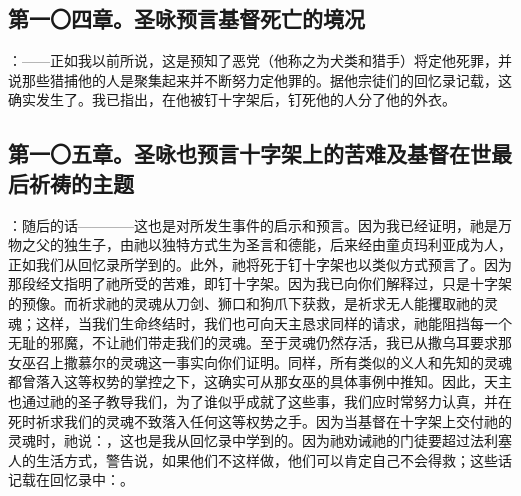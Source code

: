 
\subsection{第一〇四章。圣咏预言基督死亡的境况}

：——正如我以前所说，这是预知了恶党（他称之为犬类和猎手）将定他死罪，并说那些猎捕他的人是聚集起来并不断努力定他罪的。据他宗徒们的回忆录记载，这确实发生了。我已指出，在他被钉十字架后，钉死他的人分了他的外衣。\par


\subsection{第一〇五章。圣咏也预言十字架上的苦难及基督在世最后祈祷的主题}

：随后的话————这也是对所发生事件的启示和预言。因为我已经证明，祂是万物之父的独生子，由祂以独特方式生为圣言和德能，后来经由童贞玛利亚成为人，正如我们从回忆录所学到的。此外，祂将死于钉十字架也以类似方式预言了。因为那段经文指明了祂所受的苦难，即钉十字架。因为我已向你们解释过，只是十字架的预像。而祈求祂的灵魂从刀剑、狮口和狗爪下获救，是祈求无人能攫取祂的灵魂；这样，当我们生命终结时，我们也可向天主恳求同样的请求，祂能阻挡每一个无耻的邪魔，不让祂们带走我们的灵魂。至于灵魂仍然存活，我已从撒乌耳要求那女巫召上撒慕尔的灵魂这一事实向你们证明。同样，所有类似的义人和先知的灵魂都曾落入这等权势的掌控之下，这确实可从那女巫的具体事例中推知。因此，天主也通过祂的圣子教导我们，为了谁似乎成就了这些事，我们应时常努力认真，并在死时祈求我们的灵魂不致落入任何这等权势之手。因为当基督在十字架上交付祂的灵魂时，祂说：，这也是我从回忆录中学到的。因为祂劝诫祂的门徒要超过法利塞人的生活方式，警告说，如果他们不这样做，他们可以肯定自己不会得救；这些话记载在回忆录中：。\par

